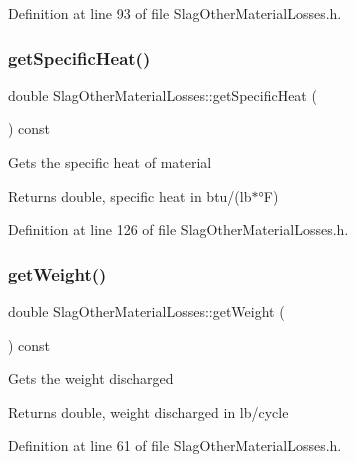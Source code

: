 Definition at line 93 of file Slag\+Other\+Material\+Losses.\+h.

\mbox{\label{class_slag_other_material_losses_aa68e92bdf836a4112c55344f897f2649}} 
\subsubsection{\texorpdfstring{get\+Specific\+Heat()}{getSpecificHeat()}}
{\footnotesize\ttfamily double Slag\+Other\+Material\+Losses\+::get\+Specific\+Heat (\begin{DoxyParamCaption}{ }\end{DoxyParamCaption}) const\hspace{0.3cm}{\ttfamily [inline]}}

Gets the specific heat of material \begin{DoxyReturn}{Returns}
double, specific heat in btu/(lb$\ast$°F) 
\end{DoxyReturn}


Definition at line 126 of file Slag\+Other\+Material\+Losses.\+h.

\mbox{\label{class_slag_other_material_losses_a9b62b86eb4ec919d70dd8899ef5d3513}} 
\subsubsection{\texorpdfstring{get\+Weight()}{getWeight()}}
{\footnotesize\ttfamily double Slag\+Other\+Material\+Losses\+::get\+Weight (\begin{DoxyParamCaption}{ }\end{DoxyParamCaption}) const\hspace{0.3cm}{\ttfamily [inline]}}

Gets the weight discharged \begin{DoxyReturn}{Returns}
double, weight discharged in lb/cycle 
\end{DoxyReturn}


Definition at line 61 of file Slag\+Other\+Material\+Losses.\+h.


